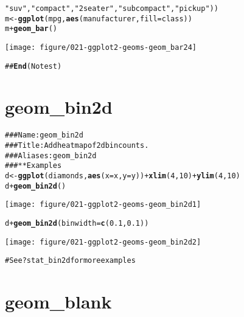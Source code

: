 \documentclass[a4paper,titlepage]{tufte-handout}\usepackage{graphicx, color}
\makeatletter
\def\maxwidth{ %
  \ifdim\Gin@nat@width>\linewidth
    \linewidth
  \else
    \Gin@nat@width
  \fi
}
\newcommand{\hlfunctioncall}[1]{\textcolor[rgb]{0.501960784313725,0,0.329411764705882}{\textbf{#1}}}%
\newcommand{\hlstring}[1]{\textcolor[rgb]{0.6,0.6,1}{#1}}%
\newcommand{\hlcomment}[1]{\textcolor[rgb]{0.180392156862745,0.6,0.341176470588235}{#1}}%
\newenvironment{kframe}{%
 \def\at@end@of@kframe{}%
 \ifinner\ifhmode%
  \def\at@end@of@kframe{\end{minipage}}%
  \begin{minipage}{\columnwidth}%
 \fi\fi%
 \def\FrameCommand##1{\hskip\@totalleftmargin \hskip-\fboxsep
 \colorbox{shadecolor}{##1}\hskip-\fboxsep
     \hskip-\linewidth \hskip-\@totalleftmargin \hskip\columnwidth}%
 \MakeFramed {\advance\hsize-\width
   \@totalleftmargin\z@ \linewidth\hsize
   \@setminipage}}%
 {\par\unskip\endMakeFramed%
 \at@end@of@kframe}
\newenvironment{knitrout}{}{} %
\makeatother
\begin{document}
\begin{knitrout}
\begin{kframe}
\begin{alltt}
\hlstring{"suv"}, \hlstring{"compact"}, \hlstring{"2seater"}, \hlstring{"subcompact"}, \hlstring{"pickup"}))
m <- \hlfunctioncall{ggplot}(mpg, \hlfunctioncall{aes}(manufacturer, fill=class))
m + \hlfunctioncall{geom_bar}()
\end{alltt}
\end{kframe}\texttt{[image: figure/021-ggplot2-geoms-geom\_bar24]} \begin{kframe}\begin{alltt}
\hlcomment{## \hlfunctioncall{End}(No test)}
\end{alltt}
\end{kframe}
\end{knitrout}


\section{geom\_bin2d}

\begin{knitrout}
\color{fgcolor}\begin{kframe}
\begin{alltt}
\hlcomment{### Name: geom_bin2d}
\hlcomment{### Title: Add heatmap of 2d bin counts.}
\hlcomment{### Aliases: geom_bin2d}
\hlcomment{### ** Examples}
d <- \hlfunctioncall{ggplot}(diamonds, \hlfunctioncall{aes}(x = x, y = y)) + \hlfunctioncall{xlim}(4,10) + \hlfunctioncall{ylim}(4,10)
d + \hlfunctioncall{geom_bin2d}()
\end{alltt}
\end{kframe}\texttt{[image: figure/021-ggplot2-geoms-geom\_bin2d1]} \begin{kframe}\begin{alltt}
d + \hlfunctioncall{geom_bin2d}(binwidth = \hlfunctioncall{c}(0.1, 0.1))
\end{alltt}
\end{kframe}\texttt{[image: figure/021-ggplot2-geoms-geom\_bin2d2]} \begin{kframe}\begin{alltt}
\hlcomment{# See ?stat_bin2d for more examples}
\end{alltt}
\end{kframe}
\end{knitrout}


\section{geom\_blank}
\end{document}

